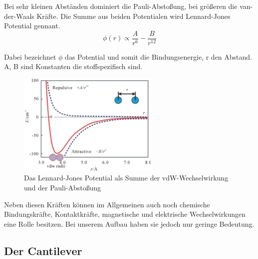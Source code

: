 Bei sehr kleinen Abständen dominiert die Pauli-Abstoßung, bei größeren die 
van-der-Waals Kräfte. Die Summe aus beiden Potentialen wird Lennard-Jones 
Potential gennant. 
\[
   \phi (r) \propto \frac{A}{r^6} - \frac{B}{r^{12}}    
\]

Dabei bezeichnet $\phi$ das Potential und somit die Bindungsenergie, r den Abstand.
A, B sind Konstanten die stoffspezifisch sind.

\begin{figure}[h!]
    \centering
    \includegraphics[width=0.6\textwidth]{Abb/ljp.jpg}
    \caption{Das Lennard-Jones Potential als Summe der vdW-Wechselwirkung und
             der Pauli-Abstoßung}
    \label{ljp}
\end{figure}

Neben diesen Kräften können im Allgemeinen auch noch chemische Bindungskräfte, Kontaktkräfte, magnetische und elektrische Wechselwirkungen eine Rolle besitzen.
Bei unserem Aufbau haben sie jedoch nur geringe Bedeutung.



\subsection{Der Cantilever}
\label{herleitung}


